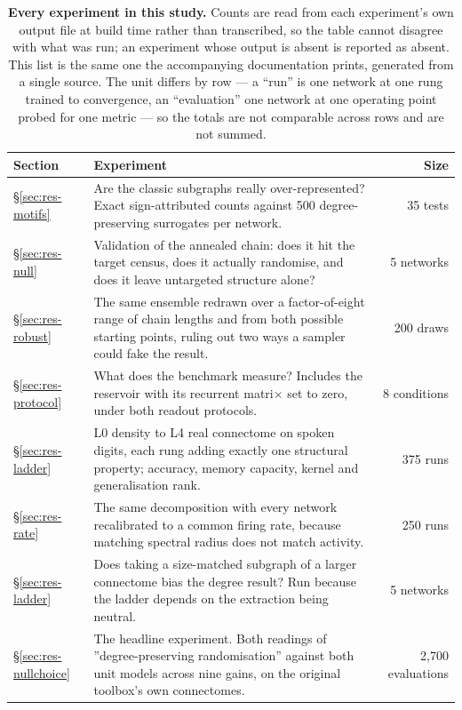 \begin{table}[t]
\centering\small
\caption{\textbf{Every experiment in this study.} Counts are read from each experiment's
own output file at build time rather than transcribed, so the table cannot disagree with
what was run; an experiment whose output is absent is reported as absent. This list is the
same one the accompanying documentation prints, generated from a single source. The unit
differs by row --- a ``run'' is one network at one rung trained to convergence, an
``evaluation'' one network at one operating point probed for one metric --- so the totals
are not comparable across rows and are not summed.}
\label{tab:experiments}
\begin{tabular}{@{}l p{} r@{}}
\toprule
\textbf{Section} & \textbf{Experiment} & \textbf{Size} \\
\midrule
\S\ref{sec:res-motifs} & Are the classic subgraphs really over-represented? Exact sign-attributed counts against 500 degree-preserving surrogates per network. & 35 tests \\
\S\ref{sec:res-null} & Validation of the annealed chain: does it hit the target census, does it actually randomise, and does it leave untargeted structure alone? & 5 networks \\
\S\ref{sec:res-robust} & The same ensemble redrawn over a factor-of-eight range of chain lengths and from both possible starting points, ruling out two ways a sampler could fake the result. & 200 draws \\
\S\ref{sec:res-protocol} & What does the benchmark measure? Includes the reservoir with its recurrent matri$\times$ set to zero, under both readout protocols. & 8 conditions \\
\S\ref{sec:res-ladder} & L0 density to L4 real connectome on spoken digits, each rung adding exactly one structural property; accuracy, memory capacity, kernel and generalisation rank. & 375 runs \\
\S\ref{sec:res-rate} & The same decomposition with every network recalibrated to a common firing rate, because matching spectral radius does not match activity. & 250 runs \\
\S\ref{sec:res-ladder} & Does taking a size-matched subgraph of a larger connectome bias the degree result? Run because the ladder depends on the extraction being neutral. & 5 networks \\
\S\ref{sec:res-nullchoice} & The headline experiment. Both readings of ''degree-preserving randomisation'' against both unit models across nine gains, on the original toolbox's own connectomes. & 2,700 evaluations \\

\end{tabular}
\end{table}

